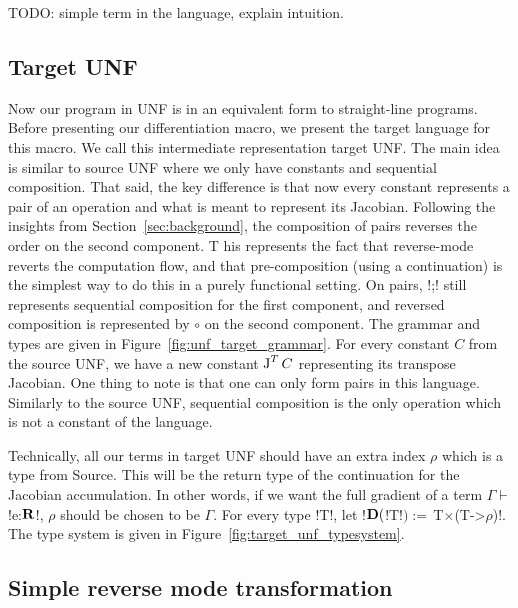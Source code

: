 

\begin{example}
    TODO: simple term in the language, explain intuition.
\end{example}


\subsection{Target UNF} %
\label{sub:Target UNF}

Now our program in UNF is in an equivalent form to straight-line programs. 
Before presenting our differentiation macro, we present the target language for this macro. 
We call this intermediate representation target UNF.
The main idea is similar to source UNF where we only have constants and sequential composition.
That said, the key difference is that now every constant represents a pair of an operation and what is meant to represent its Jacobian.
Following the insights from Section~\ref{sec:background}, the composition of pairs reverses the order on the second component. T
his represents the fact that reverse-mode reverts the computation flow, 
and that pre-composition (using a continuation) is the simplest way to do this in a purely functional setting.
On pairs, !;! still represents sequential composition for the first component, and reversed composition is represented by $\circ$ on the second component.
The grammar and types are given in Figure~\ref{fig:unf_target_grammar}. 
For every constant $C$ from the source UNF, we have a new constant $\operatorname{J}^TC$ representing its transpose Jacobian.
One thing to note is that one can only form pairs in this language. 
Similarly to the source UNF, sequential composition is the only operation which is not a constant of the language.



Technically, all our terms in target UNF should have an extra index $\rho$ which is a type from Source.
This will be the return type of the continuation for the Jacobian accumulation. 
In other words, if we want the full gradient of a term $\Gamma\vdash$!e:$\mathbf{R}$!, $\rho$ should be chosen to be $\Gamma$.
For every type !T!, let !$\mathbf{D}($!T!$):= \,$T$\times$(T->$\rho$)!. 
The type system is given in Figure~\ref{fig:target_unf_typesystem}. 




\subsection{Simple reverse mode transformation} %
\label{sub:Simple reverse mode transformation}

